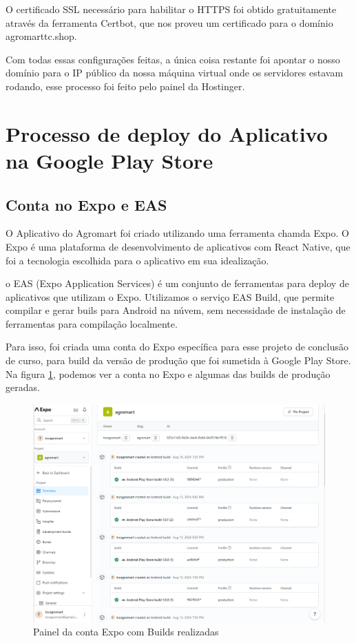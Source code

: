  O certificado SSL necessário para habilitar o HTTPS foi obtido gratuitamente através da ferramenta Certbot, que nos proveu um certificado para o domínio agromarttc.shop.

 Com todas essas configurações feitas, a única coisa restante foi apontar o nosso domínio para o IP público da nossa máquina virtual onde os servidores estavam rodando, esse processo foi feito pelo painel da Hostinger.

\section{Processo de deploy do Aplicativo na Google Play Store}

\subsection{Conta no Expo e EAS}
O Aplicativo do Agromart foi criado utilizando uma ferramenta chamda Expo. O Expo é uma plataforma de desenvolvimento de aplicativos com React Native, que foi a tecnologia escolhida para o aplicativo em sua idealização.

o EAS (Expo Application Services) é um conjunto de ferramentas para deploy de aplicativos que utilizam o Expo. Utilizamos o serviço EAS Build, que permite compilar e gerar buils para Android na núvem, sem necessidade de instalação de ferramentas para compilação localmente.

Para isso, foi criada uma conta do Expo específica para esse projeto de conclusão de curso, para build da versão de produção que foi sumetida à Google Play Store. Na figura \ref{expo}, podemos ver a conta no Expo e algumas das builds de produção geradas.

\begin{figure}[h]
	\centering
\includegraphics[keepaspectratio=true,scale=0.35]{figuras/expo.png}
	\caption{Painel da conta Expo com Builds realizadas}
	\label{expo}
\end{figure}

